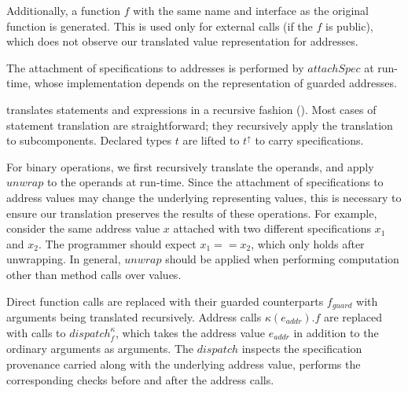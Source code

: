 % 

Additionally, a function $f$ with the same name and interface as the original function
is generated. This is used only for external calls (if the $f$ is public), which
does not observe our translated value representation for addresses.

The attachment of specifications to addresses is performed by $\mathit{attachSpec}$ 
at run-time, whose implementation depends on the representation of guarded addresses.

\lang translates statements and expressions in a recursive fashion (). 
Most cases of statement translation are straightforward; they
recursively apply the translation to subcomponents.
Declared types $t$ are lifted to $t^\uparrow$
to
carry specifications.

For binary operations, we first recursively translate the operands, 
and apply $\mathit{unwrap}$ to the operands at run-time.
Since the attachment of specifications to address values may change the underlying
representing values, this is necessary to ensure our translation preserves the 
results of these operations. For example, consider the same address value $x$
attached with two different specifications $x_1$ and $x_2$. The programmer
should expect $x_1 == x_2$, which only holds after unwrapping.
In general, $\mathit{unwrap}$ should be applied when performing computation 
other than method calls over values.

Direct function calls are replaced with their guarded counterparts $f_\textit{guard}$ with arguments being translated recursively.
Address calls $\kappa(e_\mathit{addr}).f$ are replaced with calls to $\mathit{dispatch}^\kappa_f$, %
which takes the address value $e_\mathit{addr}$ in addition to the ordinary arguments as arguments.
The $\mathit{dispatch}$ inspects the specification provenance carried along with
the underlying address value, performs the corresponding checks before and after
the address calls.

